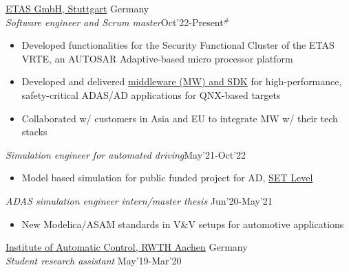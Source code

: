 \documentclass[letterpaper]{twentysecondcv} %
\begin{document}
\href{https://www.etas.com/en/}{ETAS GmbH, Stuttgart} \hfill \faMapMarker \hspace{0.02pt} Germany \\
{\sl Software engineer and Scrum master}\hfill Oct'22-Present$^{\#}$\\
\vspace{-0.6cm}
\begin{itemize}%
    \item Developed functionalities for the Security Functional Cluster of the ETAS VRTE, an AUTOSAR Adaptive-based micro processor platform
    \item Developed and delivered \href{https://edms.etas.com/}{middleware (MW) and SDK} for high-performance, safety-critical ADAS/AD applications for QNX-based targets
    \item Collaborated w/ customers in Asia and EU to integrate MW w/ their tech stacks
\end{itemize}
{\sl Simulation engineer for automated driving}\hfill May'21-Oct'22 \\
\vspace{-0.6cm}
\begin{itemize}%
	\item Model based simulation for public funded project for AD, \href{https://setlevel.de/}{SET Level}
\end{itemize}
{\sl ADAS simulation engineer intern/master thesis}
\hfill Jun'20-May'21 \\
\vspace{-0.6 cm}
\begin{itemize}%
	\item New Modelica/ASAM standards in V\&V setups for automotive applications


\end{itemize}
\href{https://www.irt.rwth-aachen.de/go/id/iung/?lidx=1}{Institute of Automatic Control, RWTH Aachen} \hfill \faMapMarker \hspace{0.02pt} Germany\\
{\sl Student research assistant} \hfill  May'19-Mar'20
\end{document}
